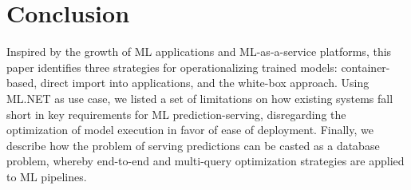 \documentclass[11pt]{article}
\newcommand{\pretzel}{\textsc{Pretzel}\xspace}
\newcommand{\mlnet}{ML.NET\xspace}
\newcommand{\at}[1]{\protect\ensuremath{\mathsf{#1}}\xspace}
\newcommand{\stitle}[1]{\noindent{\bf #1}}
\begin{document}
\section{Conclusion}




Inspired by the growth of ML applications and ML-as-a-service platforms, this paper identifies three strategies for operationalizing trained models: container-based, direct import into applications, and the white-box approach.
Using \mlnet as use case, we listed a set of limitations on how existing systems fall short in key requirements for ML prediction-serving, disregarding the optimization of model execution in favor of ease of deployment. 
Finally, we describe how the problem of serving predictions can be casted as a database problem, whereby end-to-end and multi-query optimization strategies are applied to ML pipelines.
\end{document}
